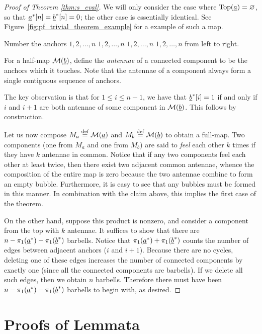 \begin{proof}[Proof of Theorem \ref{thm:s_eval}]
	We will only consider the case where $\operatorname{Top}(\underline{a}) = \varnothing$, so that $\underline{a}^\ast[n] = \underline{b}^\ast[n] = 0$; the other case is essentially identical.  See Figure~\ref{fig:pf_trivial_theorem_example} for a example of such a map.

	Number the anchors $1,2,\dots,n$ $1,2,\dots,n$ $1,2,\dots,n$ $1,2,\dots,n$ from left to right.

	For a half-map $\mathcal M(\underline{b})$, define the \emph{antennae} of a connected component to be the anchors which it touches.  Note that the antennae of a component always form a single contiguous sequence of anchors.

	The key observation is that for $1 \le i \le n-1$, we have that $\underline{b}^\ast[i] = 1$ if and only if $i$ and $i+1$ are both antennae of some component in $\mathcal M(\underline{b})$.  This follows by construction.

	Let us now compose $M_a \stackrel{\text{def}}{=} \mathcal M(\underline{a})$ and $M_b \stackrel{\text{def}}{=} \mathcal M(\underline{b})$ to obtain a full-map.  Two components (one from $M_a$ and one from $M_b$) are said to \emph{feel} each other $k$ times if they have $k$ antennae in common.  Notice that if any two components feel each other at least twice, then there exist two adjacent common antennae, whence the composition of the entire map is zero because the two antennae combine to form an empty bubble.  Furthermore, it is easy to see that any bubbles must be formed in this manner.  In combination with the claim above, this implies the first case of the theorem.

	On the other hand, suppose this product is nonzero, and consider a component from the top with $k$ antennae.  It suffices to show that there are $n - \pi_1(\underline{a}^\ast) - \pi_1(\underline{b}^\ast)$ barbells.  Notice that $\pi_1(\underline{a}^\ast) + \pi_1(\underline{b}^\ast)$ counts the number of edges between adjacent anchors ($i$ and $i+1$).  Because there are no cycles, deleting one of these edges increases the number of connected components by exactly one (since all the connected components are barbells).  If we delete all such edges, then we obtain $n$ barbells.  Therefore there must have been $n - \pi_1(\underline{a}^\ast) - \pi_1(\underline{b}^\ast)$ barbells to begin with, as desired.
\end{proof}

\section{Proofs of Lemmata}
\label{sec:lemmata_proof}
